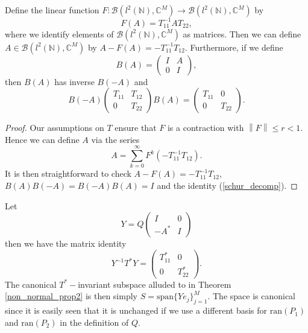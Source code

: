 \documentclass[a4paper,10pt]{article}
\begin{document}
\begin{lemma}%
\label{schur}
Define the linear function $F:\mathcal{B}(l^2(\mathbb{N}),\mathbb{C}^M)\rightarrow\mathcal{B}(l^2(\mathbb{N}),\mathbb{C}^M)$ by
$$
F(A)=T_{11}^{-1}AT_{22},
$$
where we identify elements of $\mathcal{B}(l^2(\mathbb{N}),\mathbb{C}^M)$ as matrices. Then we can define $A\in\mathcal{B}(l^2(\mathbb{N}),\mathbb{C}^M)$ by
$A-F(A)=-T_{11}^{-1}T_{12}$. Furthermore, if we define
$$
B(A)=\left(\begin{matrix}
I      & A \\
0  & I
\end{matrix}\right),
$$
then $B(A)$ has inverse $B(-A)$ and
\begin{equation}
\label{schur_decomp}
B(-A)\left(\begin{matrix}
T_{11}      & T_{12} \\
0  & T_{22}
\end{matrix}\right)B(A)=\left(\begin{matrix}
T_{11}      & 0 \\
0  & T_{22}
\end{matrix}\right).
\end{equation}
\end{lemma}
\begin{proof}
Our assumptions on $T$ ensure that $F$ is a contraction with $\left\|F\right\|\leq r<1$. Hence we can define $A$ via the series
$$
A=\sum_{k=0}^{\infty}F^{k}(-T_{11}^{-1}T_{12}).
$$
It is then straightforward to check $A-F(A)=-T_{11}^{-1}T_{12}$, $B(A)B(-A)=B(-A)B(A)=I$ and the identity (\ref{schur_decomp}).
\end{proof}

Let
$$
Y=Q\left(\begin{matrix}
I      & 0 \\
-A^*  & I
\end{matrix}\right)
$$
then we have the matrix identity
$$
Y^{-1}T^*Y=\left(\begin{matrix}
T_{11}^*      & 0 \\
0  & T_{22}^*
\end{matrix}\right).
$$
The canonical $T^*-$invariant subspace alluded to in Theorem \ref{non_normal_prop2} is then simply $S=\mathrm{span}\{Ye_j\}_{j=1}^M$. The space is canonical since it is easily seen that it is unchanged if we use a different basis for $\mathrm{ran}(P_1)$ and $\mathrm{ran}(P_2)$ in the definition of $Q$.
\end{document}

